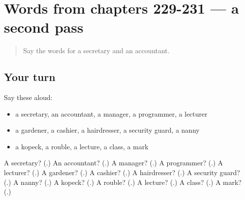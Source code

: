 \section[(dialogue)]{Words from chapters 229-231 — a second pass}

\label{lesson:RU-R231-second-pass-words-from-chapters-229-231}



\begin{quote}
Say the words for a secretary and an accountant.
\end{quote}

\subsection*{Your turn}
Say these aloud:

\begin{itemize}
\raggedright
  \item a secretary, an accountant, a manager, a programmer, a lecturer
  \item a gardener, a cashier, a hairdresser, a security guard, a nanny
  \item a kopeck, a rouble, a lecture, a class, a mark
\end{itemize}

\begin{tcolorbox}[breakable,colback=teal!4,colframe=teal!35!black,title={Before you move on}]
A secretary? (\textbf{}.) An accountant? (\textbf{}.) A manager? (\textbf{}.) A programmer? (\textbf{}.) A lecturer? (\textbf{}.) A gardener? (\textbf{}.) A cashier? (\textbf{}.) A hairdresser? (\textbf{}.) A security guard? (\textbf{}.) A nanny? (\textbf{}.) A kopeck? (\textbf{}.) A rouble? (\textbf{}.) A lecture? (\textbf{}.) A class? (\textbf{}.) A mark? (\textbf{}.)
\end{tcolorbox}
